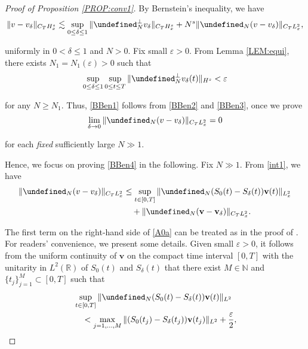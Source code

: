 \documentclass[letterpaper, 11pt,  reqno]{amsart}
\newcommand{\1}{\hspace{0.5mm}\textup{I}\hspace{0.5mm}}
\newcommand{\noi}{\noindent}
\newcommand{\R}{\mathbb{R}}
\let\P= \undefined
\newcommand{\P}{\mathbf{P}}
\newcommand{\dl}{\delta}
\newcommand{\eps}{\varepsilon}
\newcommand{\les}{\lesssim}
\newcommand{\N}{\mathbb{N}}
\newcommand{\vv}{\mathbf{v}}
\numberwithin{equation}{section}
\numberwithin{theorem}{section}
\begin{document}
\begin{proof}[Proof of Proposition \ref{PROP:conv1}]
\noi
By 
Bernstein's inequality, we have 
\begin{align}
\|v - v_\dl\|_{C_{T}H^s_x}
\les\sup_{0\le \dl \le 1} \|\P_N^\perp v_\dl\|_{C_{T}H^s_x} 
+ N^s\|\P_N(v - v_\dl)\|_{C_{T}L^2_x}, 
\label{BBen2}
\end{align}

\noi
uniformly in $0 < \dl \le 1$ and $N > 0$.
Fix small $\eps > 0$.
From Lemma \ref{LEM:equi}, 
there exists $N_1 = N_1(\eps) > 0$
such that 
\begin{align}
 \sup_{0 \le  \dl \le 1}\sup_{0 \le t \le T}
 \| \P_{N}^\perp v_\dl(t)\|_{ H^s} < \eps
\label{BBen3}
\end{align}

\noi
for any $N \ge N_1$.
Thus, \eqref{BBen1} follows 
from \eqref{BBen2} and \eqref{BBen3}, once we prove 
\begin{align}
\lim_{\dl \to 0}\|\P_N(v - v_\dl)\|_{C_{T}L^2_x}= 0
\label{BBen4}
\end{align}

\noi
for each {\it fixed} sufficiently large $N\gg1$.




Hence, we focus on proving \eqref{BBen4} in the following.
Fix $N \gg1$.
From \eqref{int1}, 
we have 
\begin{align}
\begin{split}
\| \P_N(v - v_\dl ) \|_{C_{T}L^2_x}
& \le 
\sup_{t \in [0, T]}\| \P_N(S_0(t) - S_\dl(t))\vv(t)\|_{L^2_x}\\
& \quad + \|\P_N(\vv - \vv_\dl)\|_{C_{T}L^2_x}.
\end{split}
\label{A0a}
\end{align}



\noi
The  first term on the right-hand side of \eqref{A0a}
can be treated as in the proof of \cite[Theorem~1.2]{CLOZ}.
For readers' convenience, we present some details.
Given small $\eps > 0$, it follows from the uniform continuity of $\vv$ on the
compact time interval $[0, T]$
with 
 the unitarity in $L^2(\R)$ of $S_0(t)$ and $S_\dl(t)$
 that there exist $M \in \N$ 
 and $\{t_j\}_{j = 1}^M \subset [0, T]$ such that 
\begin{align}
\begin{split}
&\sup_{t \in [0, T]}\| \P_N (S_0(t) - S_\dl(t) ) \vv(t) \|_{L^2} \\
& \quad
<  \max_{j = 1, \dots, M}\| (S_0(t_j) - S_\dl(t_j) )  \vv(t_j) \|_{L^2} 
+ \frac \eps 2, 
\end{split}
\label{A0b}
\end{align}


\end{proof}
\end{document}
